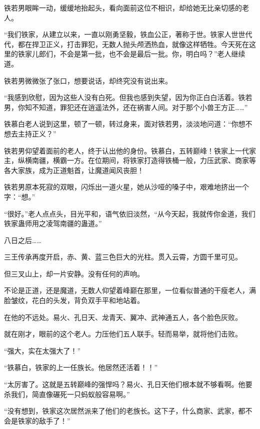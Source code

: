 
\begin{this_body}



铁若男眼眸一动，缓缓地抬起头，看向面前这位不相识，却给她无比亲切感的老人。

“我们铁家，从建立以来，一直以刚勇坚毅，铁血公正，著称于世。铁家人世世代代，都在捍卫正义，打击罪犯，无数人抛头颅洒热血，就像这样牺牲。今天死在这里的铁家儿郎们，不会是第一批，也不会是最后一批。你，明白吗？”老人继续道。

铁若男微微张了张口，想要说话，却终究没有说出来。

“我感到欣慰，因为这些人没有白死。但我也感到失望，因为你正白白活着。铁若男，你知不知道，罪犯还在逍遥法外，还在祸害人间。对于那个小兽王方正……”

铁慕白老人说到这里，顿了一顿，转过身来，面对铁若男，淡淡地问道：“你想不想去主持正义？”

铁若男仰望着面前的老人，终于认出他的身份。铁慕白，五转巅峰！铁家上一代家主，纵横南疆，横霸一方。在位期间，将铁家打造得铁桶一般，力压武家、商家等各大家族，成为正道魁首，让魔道闻风丧胆！

铁若男原本死寂的双眼，闪烁出一道火星，她从沙哑的嗓子中，艰难地挤出一个字：“想。”

“很好。”老人点点头，目光平和，语气依旧淡然，“从今天起，我就传你金道，我们铁家蛊师用之凌驾南疆的蛊道。”

八日之后……

三王传承再度开启，赤、黄、蓝三色巨大的光柱。贯入云霄，方圆千里可见。

但三叉山上，却一片安静。没有任何的声响。

不论是正道，还是魔道，无数人仰望着峰巅在那里，一位看似普通的干瘦老人，满脸皱纹，花白的头发，背负双手平和地站着。

在他的不远处。易火、孔日天、龙青天、翼冲、武神通五人，各个脸色灰败。

就在刚才，眼前的这个老人。力压他们五人联手。轻而易举，就将他们击败。

“强大，实在太强大了！”

“铁慕白，铁家的上一任族长。他居然还活着！！”

“太厉害了。这就是五转巅峰的强悍吗？易火、孔日天他们根本就不够看啊。他要杀我们，简直像碾死一只蚂蚁般容易啊。”

“没有想到，铁家这次居然派来了他们的老族长。这下子，什么商家、武家，都不会是铁家的敌手了！”


\end{this_body}
